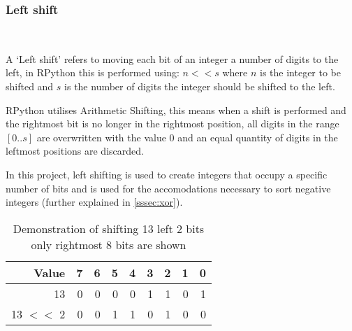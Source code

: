 \documentclass[12pt]{article}
\begin{document}
\subsubsection{Left shift}\
\label{sssec:leftshift}
\par
A `Left shift' refers to moving each bit of an integer a number of digits to the left, in RPython this is performed using: $n << s$ where $n$ is the integer to be shifted and $s$ is the number of digits the integer should be shifted to the left.
\par
RPython utilises Arithmetic Shifting, this means when a shift is performed and the rightmost bit is no longer in the rightmost position, all digits in the range $[0 .. s]$ are overwritten with the value 0 and an equal quantity of digits in the leftmost positions are discarded.
\par
In this project, left shifting is used to create integers that occupy a specific number of bits and is used for the accomodations necessary to sort negative integers (further explained in \ref{sssec:xor}). 
\par

\begin{table}[htpb]
	\centering
\begin{tabular}{r|rrrrrrrr}
	
	\hline
	 Value   &   7 &   6 &   5 &   4 &   3 &   2 &   1 &   0 \\
	\hline
	 13      &   0 &   0 &   0 &   0 &   1 &   1 &   0 &   1 \\
	 13 \ensuremath{<}\ensuremath{<} 2 &   0 &   0 &   1 &   1 &   0 &   1 &   0 &   0 \\
	\hline
\end{tabular}
\caption{Demonstration of shifting 13 left 2 bits \\ only rightmost 8 bits are shown}
\end{table}
\end{document}
